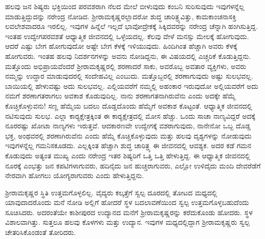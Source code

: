 ಹಲವು ಜನ ಶಿಷ್ಯರು ಭಕ್ತಿಯಿಂದ ಪರವಶರಾಗಿ ನೆಲದ ಮೇಲೆ ಬೀಳುವುದು ಕಂಬನಿ ಸುರಿಸುವುದು ಇವುಗಳನ್ನೆಲ್ಲ ಮಾಡುತ್ತಿದ್ದುದನ್ನು ನರೇಂದ್ರ ನೋಡಿದ. ಶ‍್ರೀರಾಮಕೃಷ್ಣರಲ್ಲಾದರೋ ಶುದ್ಧ ಚಾರಿತ್ರ್ಯವಿತ್ತು, ಕಾಮಕಾಂಚನಾಸಕ್ತಿ ಲವಲೇಶವಾದರೂ ಇರಲಿಲ್ಲ. ಇವುಗಳ ಹಿನ್ನೆಲೆ ಇಲ್ಲದೆ ಭಾವೋದ್ರೇಕಕ್ಕೆ ಸಿಕ್ಕಿದವರನ್ನು ನರೇಂದ್ರ ಚೆನ್ನಾಗಿ ಹಂಗಿಸುತ್ತಿದ್ದ. ಇಂತಹ ಉದ್ವೇಗಪರವಶತೆ ಆಧ್ಯಾತ್ಮಿಕ ಜೀವನದಲ್ಲಿ ಒಳ್ಳೆಯದಲ್ಲ. ಕೆಲವು ವೇಳೆ ಮನಸ್ಸು ಮೇಲಕ್ಕೆ ಹೋಗುವುದು. ಆದರೆ ಎಷ್ಟು ಬೇಗ ಹೋಗುವುದೋ ಅಷ್ಟೇ ಬೇಗ ಕೆಳಕ್ಕೆ ಇಳಿಯುವುದು. ಹಿಂದಿಗಿಂತ ಹೆಚ್ಚಾಗಿ ಅವರು ಕೆಳಕ್ಕೆ ಹೋಗುವರು. ಇಂತಹ ಹಲವು ನಿದರ್ಶನಗಳನ್ನು ಅವನು ನೋಡಿದ್ದನು, ಈ ವಿಷಯದಲ್ಲಿ ಎಚ್ಚರಿಕೆ ಕೊಡುತ್ತಿದ್ದನು. ಮತ್ತೊಂದು ಅಭಿಪ್ರಾಯವೆಂದರೆ ಶ‍್ರೀರಾಮಕೃಷ್ಣರಲ್ಲಿ ಶರಣಾದರೆ ಸಾಕು, ಅವರೊಬ್ಬ ಅವತಾರ ವ್ಯಕ್ತಿಗಳು, ಅವರು ನಮ್ಮನ್ನು ಉದ್ಧಾರ ಮಾಡುವುದರಲ್ಲಿ ಸಂದೇಹವಿಲ್ಲ ಎಂಬುದು. ಮತ್ತೊಬ್ಬರಲ್ಲಿ ಶರಣಾಗುವುದು ಅಷ್ಟು ಸುಲಭವಲ್ಲ. ಬಾಯಿಯಲ್ಲಿ ಹೇಳುವಷ್ಟು ಅದು ಸುಲಭವಲ್ಲ. ಎಲ್ಲಿಯವರೆಗೆ ನಮ್ಮಲ್ಲಿ ಅಹಂಕಾರ ಇರುವುದೋ ಅಲ್ಲಿಯವರೆಗೆ ಅದು ನಮಗೆ ಶರಣಾಗತರಾಗಲು ಅವಕಾಶ ಕೊಡುವುದಿಲ್ಲ. ನಾನು ಶರಣಾಗತನಾಗಿರುವೆನು ಎಂದು ಅದಕ್ಕೇ ಹೆಮ್ಮೆ ಕೊಚ್ಚಿಕೊಳ್ಳುವನು! ಸಣ್ಣ ಹೆಮ್ಮೆಯ ಬದಲು ದೊಡ್ಡದೊಂದು ಹೆಮ್ಮೆಗೆ ಅವಕಾಶ ಕೊಟ್ಟಂತೆ. ಆಧ್ಯಾತ್ಮಿಕ ಜೀವನದಲ್ಲಿ ನಟಿಸುವುದು ಸುಲಭ. ಎಲ್ಲಾ ಕಾರ‍್ಯಕ್ಷೇತ್ರಕ್ಕಿಂತ ಈ ಕಾರ‍್ಯಕ್ಷೇತ್ರದಲ್ಲಿ ಮೋಸ ಹೆಚ್ಚು. ಒಂದು ಸಾಚಾ ನಾಣ್ಯವಿದ್ದರೆ ಅದಕ್ಕೆ ನೂರರಷ್ಟು ಖೋಟಾ ನಾಣ್ಯಗಳು ಇರುತ್ತವೆ. ಆದಕಾರಣವೇ ಉದ್ವೇಗಕ್ಕೆ ವಶರಾಗುವುದು, ನಾನೇನೋ ಒಬ್ಬ ದೊಡ್ಡ ಭಕ್ತ, ಅಂಥವರಲ್ಲಿ ಶರಣಾಗಿರುವೆನು ಎಂದು ಹೆಮ್ಮೆ ಕೊಚ್ಚಿಕೊಳ್ಳುವುದು ಮತ್ತು ಹಲವು ದೃಶ್ಯಗಳನ್ನು ನೋಡುವುದು ಇವುಗಳನ್ನೆಲ್ಲ ಗಮನಿಸಕೂಡದು. ಎಲ್ಲಕ್ಕಿಂತ ಹೆಚ್ಚಾಗಿ ಶುದ್ಧ ಚಾರಿತ್ರ್ಯ ಈ ಜೀವನದಲ್ಲಿ ಆವಶ್ಯಕ. ಅದರ ಕಡೆ ಗಮನ ಕೊಡುವುದು ಅತ್ಯಂತ ಮುಖ್ಯ ಎಂದು ನರೇಂದ್ರ ಇತರ ಶಿಷ್ಯರಿಗೆ ಒತ್ತಿ ಒತ್ತಿ ಹೇಳುತ್ತಿದ್ದ. ಈ ಆಧ್ಯಾತ್ಮಿಕ ಜೀವನದಲ್ಲಿ ನೂರಕ್ಕೆ ಎಂಭತ್ತು ಜನ ಕಪಟಿಗಳಾಗುವರು, ಹದಿನೈದು ಜನ ಹುಚ್ಚರಾಗುವರು, ಎಲ್ಲೋ ಉಳಿದೈದು ಮಂದಿ ದೇವರೆಡೆಗೆ ನೇರವಾಗಿ ಹೋಗಲು ಯೋಗ್ಯರಾಗುವರು ಎಂದು ಹೇಳುತ್ತಿದ್ದನು.

ಶ‍್ರೀರಾಮಕೃಷ್ಣರ ಸ್ಥಿತಿ ಉತ್ತಮಗೊಳ್ಳಲಿಲ್ಲ. ವೈದ್ಯರು ಕಲ್ಕತ್ತೆಗೆ ಸ್ವಲ್ಪ ದೂರದಲ್ಲಿ ತೋಟದ ಮಧ್ಯದಲ್ಲಿ ಯಾವುದಾದರೊಂದು ಮನೆ ನೋಡಿ ಅಲ್ಲಿಗೆ ಹೋದರೆ ಸ್ಥಳ ಬದಲಾವಣೆಯಿಂದ ಸ್ವಲ್ಪ ಉತ್ತಮಗೊಳ್ಳಬಹುದೆಂದು ಸೂಚಿಸಿದರು. ಅದರಂತೆಯೇ ಕಾಶೀಪುರದ ಉದ್ಯಾನದ ಮನೆಗೆ ಶ‍್ರೀರಾಮಕೃಷ್ಣರನ್ನು ಕರೆದುಕೊಂಡು ಹೋದರು. ಸ್ಥಳ ವಿಶಾಲವಾಗಿತ್ತು. ಸುತ್ತಲೂ ಹಲವು ಕೊಳಗಳು ಮತ್ತು ಉದ್ಯಾನ. ಇವುಗಳ ಮಧ್ಯದಲ್ಲಿದ್ದಾಗ ಶ‍್ರೀರಾಮಕೃಷ್ಣರು ಸ್ವಲ್ಪ ಚೇತರಿಸಿಕೊಂಡಂತೆ ತೋರಿದರು.

